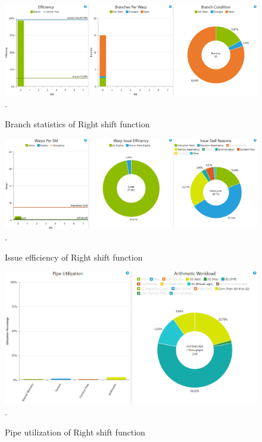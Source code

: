 \documentclass[oneside,openright,12pt,final,en]{mgr}
\begin{document}
\begin{figure}[H]
	\centering
	\includegraphics[width=\textwidth]{rightshift_branch}.
	\caption{Branch statistics of Right shift function}
	\label{fig:rightshift_branch}
\end{figure}

\begin{figure}[H]
	\centering
	\includegraphics[width=\textwidth]{rightshift_issue}.
	\caption{Issue efficiency of Right shift function}
	\label{fig:rightshift_issue}
\end{figure}

\begin{figure}[H]
	\centering
	\includegraphics[width=\textwidth]{rightshift_pipe}.
	\caption{Pipe utilization of Right shift function}
	\label{fig:rightshift_pipe}
\end{figure}
\end{document}
